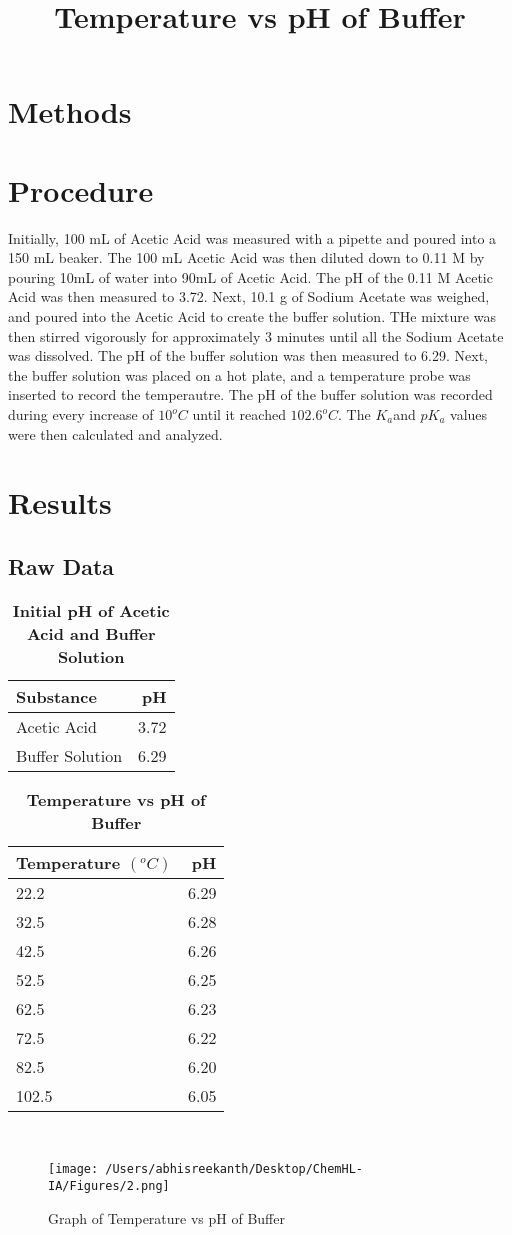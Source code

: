 \documentclass{article}
\begin{document}
\section*{Methods}%
\section*{Procedure} %
Initially, 100 mL of Acetic Acid was measured with a pipette and poured into a 150 mL beaker. The 100 mL Acetic Acid was then diluted down to 0.11 M by pouring 10mL of water into 90mL of Acetic Acid. The pH of the 0.11 M Acetic Acid was then measured to 3.72. Next, 10.1 g of Sodium Acetate was weighed, and poured into the Acetic Acid to create the buffer solution. THe mixture was then stirred vigorously for approximately 3 minutes until all the Sodium Acetate was dissolved. The pH of the buffer solution was then measured to 6.29. Next, the buffer solution was placed on a hot plate, and a temperature probe was inserted to record the temperautre. The pH of the buffer solution was recorded during every increase of $10^o C$ until it reached $102.6^o C$. The $K_a$and $pK_a$ values were then calculated and analyzed. 
\section*{Results} %
\subsection*{Raw Data} %
\begin{table}[H]
	\centering
	\caption*{\bf{Initial pH of Acetic Acid and Buffer Solution}}
	\begin{tabular}{l | r} \\
	Substance & pH \\ \hline
	Acetic Acid & 3.72 \\
	Buffer Solution & 6.29 \\
	\end{tabular}
\end{table} 
\begin{table}[H]
	\centering
	\title{Temperature vs pH of Buffer}
	\caption*{\bf{Temperature vs pH of Buffer}}
	\begin{tabular}{l | r} \\
	Temperature $(^oC)$ & pH \\ \hline
	22.2 & 6.29 \\ 
	32.5 & 6.28 \\
	42.5 & 6.26 \\
	52.5 & 6.25 \\
	62.5 & 6.23 \\
	72.5 & 6.22 \\
	82.5 & 6.20 \\
	102.5 & 6.05 \\
	\end{tabular} \\
\end{table} 
\begin{figure}[H]
	\centering 
	\texttt{[image: /Users/abhisreekanth/Desktop/ChemHL-IA/Figures/2.png]}
	\caption{Graph of Temperature vs pH of Buffer}
\end{figure}
\end{document}
